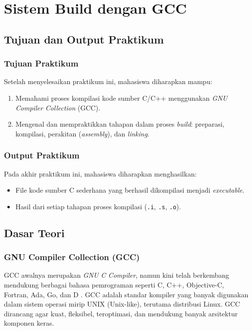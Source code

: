 
\chapter{Sistem Build dengan GCC}
\label{chap:modul-05}

\section{Tujuan dan Output Praktikum}

\subsection{Tujuan Praktikum}
Setelah menyelesaikan praktikum ini, mahasiswa diharapkan mampu:
\begin{enumerate}
	\item Memahami proses kompilasi kode sumber C/C++ menggunakan \textit{GNU Compiler Collection} (GCC).
	\item Mengenal dan mempraktikkan tahapan dalam proses \textit{build}: preparasi, kompilasi, perakitan (\textit{assembly}), dan \textit{linking}.
\end{enumerate}

\subsection{Output Praktikum}
Pada akhir praktikum ini, mahasiswa diharapkan menghasilkan:
\begin{itemize}
	\item File kode sumber C sederhana yang berhasil dikompilasi menjadi \textit{executable}.
	\item Hasil dari setiap tahapan proses kompilasi (\texttt{.i}, \texttt{.s}, \texttt{.o}).
\end{itemize}

\newpage
\section{Dasar Teori}

\subsection{GNU Compiler Collection (GCC)}
GCC awalnya merupakan \textit{GNU C Compiler}, namun kini telah berkembang mendukung berbagai bahasa pemrograman seperti C, C++, Objective-C, Fortran, Ada, Go, dan D \cite{gough2004introduction}. GCC adalah standar kompiler yang banyak digunakan dalam sistem operasi mirip UNIX (Unix-like), terutama distribusi Linux. GCC dirancang agar kuat, fleksibel, teroptimasi, dan mendukung banyak arsitektur komponen keras.

